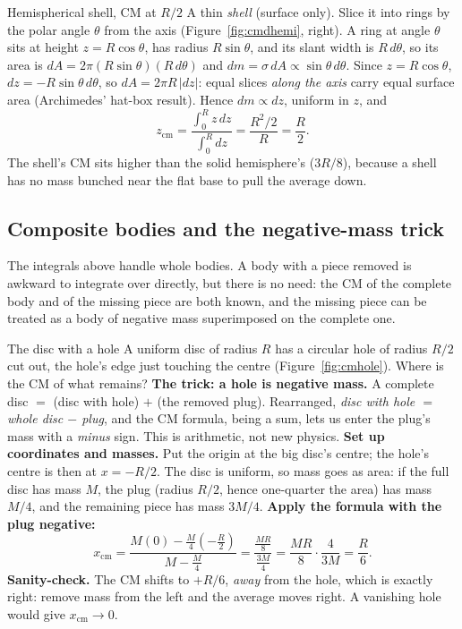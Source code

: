 \begin{derivbox}{Hemispherical shell, CM at $R/2$}
A thin \emph{shell} (surface only). Slice it into rings by the polar angle $\theta$ from the axis
(Figure~\ref{fig:cmdhemi}, right). A ring
at angle $\theta$ sits at height $z=R\cos\theta$, has radius $R\sin\theta$, and its slant width is
$R\,d\theta$, so its area is $dA=2\pi(R\sin\theta)(R\,d\theta)$ and $dm=\sigma\,dA\propto\sin\theta\,d\theta$.
Since $z=R\cos\theta$, $dz=-R\sin\theta\,d\theta$, so $dA=2\pi R\,|dz|$: equal slices \emph{along the
axis} carry equal surface area (Archimedes' hat-box result). Hence $dm\propto dz$, uniform in $z$, and
\[
z_{\text{cm}}=\frac{\int_0^R z\,dz}{\int_0^R dz}=\frac{R^2/2}{R}=\frac{R}{2}.
\]
The shell's CM sits higher than the solid hemisphere's ($3R/8$), because a shell has no mass bunched near
the flat base to pull the average down.
\end{derivbox}

\subsection{Composite bodies and the negative-mass trick}

The integrals above handle whole bodies. A body with a piece removed is awkward to integrate over directly,
but there is no need: the CM of the complete body and of the missing piece are both known, and the missing
piece can be treated as a body of negative mass superimposed on the complete one.

\begin{derivbox}{The disc with a hole}
A uniform disc of radius $R$ has a circular hole of radius $R/2$ cut out, the hole's edge just touching
the centre (Figure~\ref{fig:cmhole}). Where is the CM of what remains?
 \textbf{The trick: a hole is negative mass.} A complete disc $=$ (disc with hole) $+$ (the
removed plug). Rearranged, \emph{disc with hole $=$ whole disc $-$ plug}, and the CM formula, being a
sum, lets us enter the plug's mass with a \emph{minus} sign. This is arithmetic, not new physics.
 \textbf{Set up coordinates and masses.} Put the origin at the big disc's centre; the hole's
centre is then at $x=-R/2$. The disc is uniform, so mass goes as area: if the full disc has mass $M$, the
plug (radius $R/2$, hence one-quarter the area) has mass $M/4$, and the remaining piece has mass $3M/4$.
 \textbf{Apply the formula with the plug negative:}
\[
x_{\text{cm}}=\frac{M(0)-\tfrac{M}{4}\!\left(-\tfrac{R}{2}\right)}{M-\tfrac{M}{4}}
=\frac{\tfrac{MR}{8}}{\tfrac{3M}{4}}=\frac{MR}{8}\cdot\frac{4}{3M}=\frac{R}{6}.
\]
 \textbf{Sanity-check.} The CM shifts to $+R/6$, \emph{away} from the hole, which is exactly
right: remove mass from the left and the average moves right. A vanishing hole would give $x_{\text{cm}}\to0$.
\end{derivbox}

